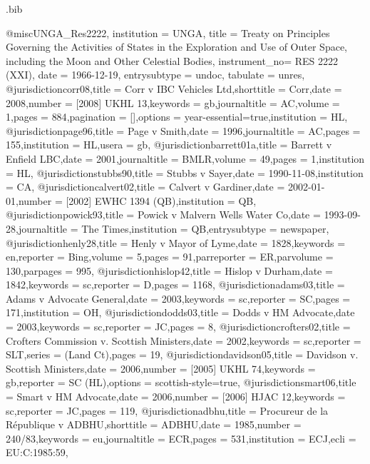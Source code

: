 
\begin{filecontents*}{\jobname.bib}

@misc{UNGA_Res2222, 
  institution  = {UNGA},
  title        = {Treaty on Principles Governing the Activities of States in the Exploration and Use of Outer Space, including the Moon and Other Celestial Bodies}, 
  instrument_no= {RES 2222 (XXI)}, 
  date         = {1966-12-19},
  entrysubtype = {undoc},
  tabulate = {unres},
  }
@jurisdiction{corr08,title = {Corr v IBC Vehicles Ltd},shorttitle = {Corr},date = {2008},number = {[2008]  UKHL 13},keywords = {gb},journaltitle = {AC},volume = {1},pages = {884},pagination = {[]},options = {year-essential=true},institution = {HL},}
@jurisdiction{page96,title = {Page v Smith},date = {1996},journaltitle = {AC},pages = {155},institution = {HL},usera = {gb},}
@jurisdiction{barrett01a,title = {Barrett v Enfield LBC},date = {2001},journaltitle = {BMLR},volume = {49},pages = {1},institution = {HL},}
@jurisdiction{stubbs90,title = {Stubbs v Sayer},date = { 1990-11-08},institution = {CA},}
@jurisdiction{calvert02,title = {Calvert v Gardiner},date = { 2002-01-01},number = {[2002] EWHC 1394 (QB)},institution = {QB},}
@jurisdiction{powick93,title = {Powick v Malvern Wells Water Co},date = {1993-09-28},journaltitle = {The Times},institution = {QB},entrysubtype = {newspaper},}
@jurisdiction{henly28,title = {Henly v Mayor of Lyme},date = {1828},keywords = {en},reporter = {Bing},volume = {5},pages = {91},parreporter = {ER},parvolume = {130},parpages = {995},}
@jurisdiction{hislop42,title = {Hislop v Durham},date = {1842},keywords = {sc},reporter = {D},pages = {1168},}
@jurisdiction{adams03,title = {Adams v Advocate General},date = {2003},keywords = {sc},reporter = {SC},pages = {171},institution = {OH},}
@jurisdiction{dodds03,title = {Dodds v HM Advocate},date = {2003},keywords = {sc},reporter = {JC},pages = {8},}
@jurisdiction{crofters02,title = {Crofters Commission v. Scottish Ministers},date = {2002},keywords = {sc},reporter = {SLT},series = {(Land Ct)},pages = {19},}
@jurisdiction{davidson05,title = {Davidson v. Scottish Ministers},date = {2006},number = {[2005] UKHL 74},keywords = {gb},reporter = {SC (HL)},options = {scottish-style=true},}
@jurisdiction{smart06,title = {Smart v HM Advocate},date = {2006},number = {[2006] HJAC 12},keywords = {sc},reporter = {JC},pages = {119},}
@jurisdiction{adbhu,title = {Procureur de la République v ADBHU},shorttitle = {ADBHU},date = {1985},number = {240/83},keywords = {eu},journaltitle = {ECR},pages = {531},institution = {ECJ},ecli = {EU:C:1985:59},}

\end{filecontents*}
